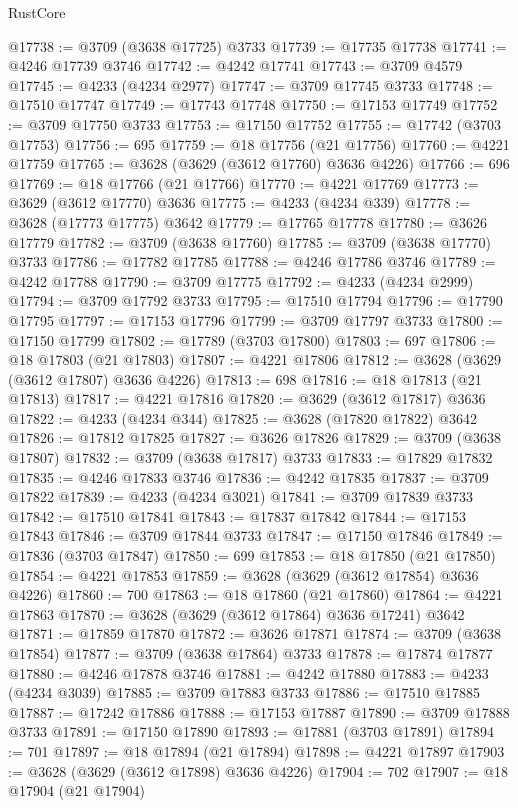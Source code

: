 \begin{lexlean}{RustCore}
\begin{coremodule}
@17738 := @3709 (@3638 @17725) @3733
@17739 := @17735 @17738
@17741 := @4246 @17739 @3746
@17742 := @4242 @17741
@17743 := @3709 @4579
@17745 := @4233 (@4234 @2977)
@17747 := @3709 @17745 @3733
@17748 := @17510 @17747
@17749 := @17743 @17748
@17750 := @17153 @17749
@17752 := @3709 @17750 @3733
@17753 := @17150 @17752
@17755 := @17742 (@3703 @17753)
@17756 := 695
@17759 := @18 @17756 (@21 @17756)
@17760 := @4221 @17759
@17765 := @3628 (@3629 (@3612 @17760) @3636 @4226)
@17766 := 696
@17769 := @18 @17766 (@21 @17766)
@17770 := @4221 @17769
@17773 := @3629 (@3612 @17770) @3636
@17775 := @4233 (@4234 @339)
@17778 := @3628 (@17773 @17775) @3642
@17779 := @17765 @17778
@17780 := @3626 @17779
@17782 := @3709 (@3638 @17760)
@17785 := @3709 (@3638 @17770) @3733
@17786 := @17782 @17785
@17788 := @4246 @17786 @3746
@17789 := @4242 @17788
@17790 := @3709 @17775
@17792 := @4233 (@4234 @2999)
@17794 := @3709 @17792 @3733
@17795 := @17510 @17794
@17796 := @17790 @17795
@17797 := @17153 @17796
@17799 := @3709 @17797 @3733
@17800 := @17150 @17799
@17802 := @17789 (@3703 @17800)
@17803 := 697
@17806 := @18 @17803 (@21 @17803)
@17807 := @4221 @17806
@17812 := @3628 (@3629 (@3612 @17807) @3636 @4226)
@17813 := 698
@17816 := @18 @17813 (@21 @17813)
@17817 := @4221 @17816
@17820 := @3629 (@3612 @17817) @3636
@17822 := @4233 (@4234 @344)
@17825 := @3628 (@17820 @17822) @3642
@17826 := @17812 @17825
@17827 := @3626 @17826
@17829 := @3709 (@3638 @17807)
@17832 := @3709 (@3638 @17817) @3733
@17833 := @17829 @17832
@17835 := @4246 @17833 @3746
@17836 := @4242 @17835
@17837 := @3709 @17822
@17839 := @4233 (@4234 @3021)
@17841 := @3709 @17839 @3733
@17842 := @17510 @17841
@17843 := @17837 @17842
@17844 := @17153 @17843
@17846 := @3709 @17844 @3733
@17847 := @17150 @17846
@17849 := @17836 (@3703 @17847)
@17850 := 699
@17853 := @18 @17850 (@21 @17850)
@17854 := @4221 @17853
@17859 := @3628 (@3629 (@3612 @17854) @3636 @4226)
@17860 := 700
@17863 := @18 @17860 (@21 @17860)
@17864 := @4221 @17863
@17870 := @3628 (@3629 (@3612 @17864) @3636 @17241) @3642
@17871 := @17859 @17870
@17872 := @3626 @17871
@17874 := @3709 (@3638 @17854)
@17877 := @3709 (@3638 @17864) @3733
@17878 := @17874 @17877
@17880 := @4246 @17878 @3746
@17881 := @4242 @17880
@17883 := @4233 (@4234 @3039)
@17885 := @3709 @17883 @3733
@17886 := @17510 @17885
@17887 := @17242 @17886
@17888 := @17153 @17887
@17890 := @3709 @17888 @3733
@17891 := @17150 @17890
@17893 := @17881 (@3703 @17891)
@17894 := 701
@17897 := @18 @17894 (@21 @17894)
@17898 := @4221 @17897
@17903 := @3628 (@3629 (@3612 @17898) @3636 @4226)
@17904 := 702
@17907 := @18 @17904 (@21 @17904)

\end{coremodule}
\end{lexlean}
